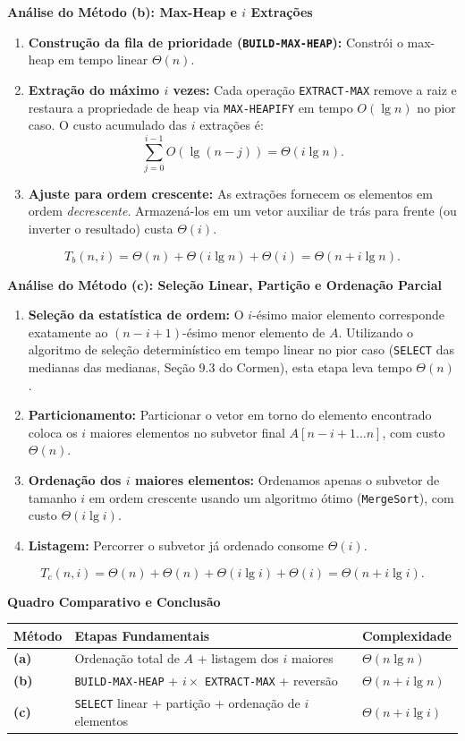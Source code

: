 \documentclass[11pt,a4paper]{article}
\newcommand{\topico}[1]{\par\medskip\textbf{\color{azul}#1}\par}
\begin{document}
\topico{Análise do Método (b): Max-Heap e $i$ Extrações}
\begin{enumerate}
    \item \textbf{Construção da fila de prioridade (\texttt{BUILD-MAX-HEAP}):} Constrói o max-heap em tempo linear $\Theta(n)$.
    \item \textbf{Extração do máximo $i$ vezes:} Cada operação \texttt{EXTRACT-MAX} remove a raiz e restaura a propriedade de heap via \texttt{MAX-HEAPIFY} em tempo $O(\lg n)$ no pior caso. O custo acumulado das $i$ extrações é:
    \[
    \sum_{j=0}^{i-1} O(\lg(n - j)) = \Theta(i \lg n).
    \]
    \item \textbf{Ajuste para ordem crescente:} As extrações fornecem os elementos em ordem \textit{decrescente}. Armazená-los em um vetor auxiliar de trás para frente (ou inverter o resultado) custa $\Theta(i)$.
\end{enumerate}
\[
T_b(n, i) = \Theta(n) + \Theta(i \lg n) + \Theta(i) = \Theta(n + i \lg n).
\]

\topico{Análise do Método (c): Seleção Linear, Partição e Ordenação Parcial}
\begin{enumerate}
    \item \textbf{Seleção da estatística de ordem:} O $i$-ésimo maior elemento corresponde exatamente ao $(n - i + 1)$-ésimo menor elemento de $A$. Utilizando o algoritmo de seleção determinístico em tempo linear no pior caso (\texttt{SELECT} das medianas das medianas, Seção 9.3 do Cormen), esta etapa leva tempo $\Theta(n)$.
    \item \textbf{Particionamento:} Particionar o vetor em torno do elemento encontrado coloca os $i$ maiores elementos no subvetor final $A[n - i + 1 \dots n]$, com custo $\Theta(n)$.
    \item \textbf{Ordenação dos $i$ maiores elementos:} Ordenamos apenas o subvetor de tamanho $i$ em ordem crescente usando um algoritmo ótimo (\texttt{MergeSort}), com custo $\Theta(i \lg i)$.
    \item \textbf{Listagem:} Percorrer o subvetor já ordenado consome $\Theta(i)$.
\end{enumerate}
\[
T_c(n, i) = \Theta(n) + \Theta(n) + \Theta(i \lg i) + \Theta(i) = \Theta(n + i \lg i).
\]

\topico{Quadro Comparativo e Conclusão}
\begin{center}
\small
\setlength{\tabcolsep}{5pt}
\begin{tabular}{p{1.2cm}p{8.8cm}p{3.8cm}}
\toprule
\textbf{Método} & \textbf{Etapas Fundamentais} & \textbf{Complexidade} \\ \midrule
\textbf{(a)} & Ordenação total de $A$ + listagem dos $i$ maiores & $\Theta(n \lg n)$ \\
\textbf{(b)} & \texttt{BUILD-MAX-HEAP} + $i \times$ \texttt{EXTRACT-MAX} + reversão & $\Theta(n + i \lg n)$ \\
\textbf{(c)} & \texttt{SELECT} linear + partição + ordenação de $i$ elementos & $\Theta(n + i \lg i)$ \\
\bottomrule
\end{tabular}
\end{center}
\end{document}
